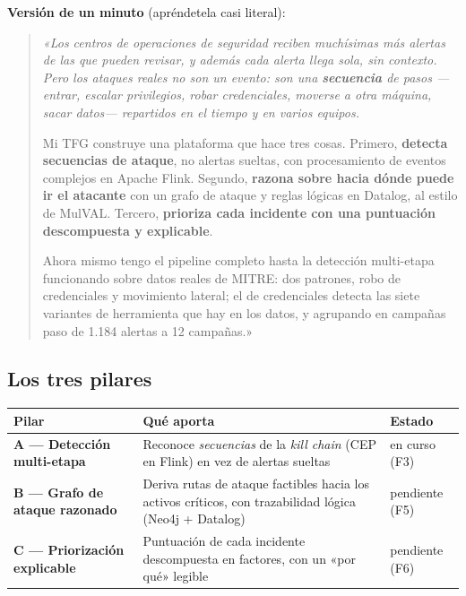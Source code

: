 \documentclass[11pt,a4paper]{article}
\begin{document}
\textbf{Versión de un minuto} (apréndetela casi literal):

\begin{quote}
\itshape
«Los centros de operaciones de seguridad reciben muchísimas más alertas de las que pueden revisar,
y además cada alerta llega sola, sin contexto. Pero los ataques reales no son un evento: son una
\textbf{secuencia} de pasos —entrar, escalar privilegios, robar credenciales, moverse a otra máquina,
sacar datos— repartidos en el tiempo y en varios equipos.

Mi TFG construye una plataforma que hace tres cosas. Primero, \textbf{detecta secuencias de ataque},
no alertas sueltas, con procesamiento de eventos complejos en Apache Flink. Segundo, \textbf{razona
sobre hacia dónde puede ir el atacante} con un grafo de ataque y reglas lógicas en Datalog, al estilo
de MulVAL. Tercero, \textbf{prioriza cada incidente con una puntuación descompuesta y explicable}.

Ahora mismo tengo el pipeline completo hasta la detección multi-etapa funcionando sobre datos reales
de MITRE: dos patrones, robo de credenciales y movimiento lateral; el de credenciales detecta las
siete variantes de herramienta que hay en los datos, y agrupando en campañas paso de 1.184 alertas a
12 campañas.»
\end{quote}

\subsection*{Los tres pilares}

\begin{center}
\renewcommand{\arraystretch}{1.25}
\begin{tabularx}{\linewidth}{>{\bfseries}l X l}
\toprule
Pilar & Qué aporta & Estado \\
\midrule
A — Detección multi-etapa & Reconoce \textit{secuencias} de la \textit{kill chain} (CEP en Flink) en vez de alertas sueltas & en curso (F3) \\
B — Grafo de ataque razonado & Deriva rutas de ataque factibles hacia los activos críticos, con trazabilidad lógica (Neo4j + Datalog) & pendiente (F5) \\
C — Priorización explicable & Puntuación de cada incidente descompuesta en factores, con un «por qué» legible & pendiente (F6) \\
\bottomrule
\end{tabularx}
\end{center}
\end{document}

